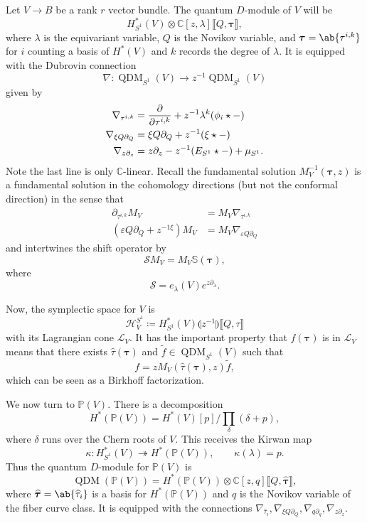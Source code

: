 \documentclass[leqno, openany]{memoir}
\theoremstyle{definition}
\theoremstyle{remark}
\theoremstyle{plain}
\theoremstyle{definition}
\theoremstyle{remark}
\newcommand{\C}{\mathbb{C}}
\renewcommand{\P}{\mathbb{P}}
\newcommand{\ep}{\varepsilon}
\newcommand{\mc}[1]{\mathcal{#1}}
\newcommand{\wt}[1]{\widetilde{#1}}
\newcommand{\wh}[1]{\widehat{#1}}
\DeclareMathOperator{\QDM}{QDM}
\begin{document}
Let $V \to B$ be a rank $r$ vector bundle. The quantum $D$-module of $V$ will be
\[ H^*_{S^1}(V) \otimes \C[z,\lambda] \llbracket Q,\bm{\tau} \rrbracket, \]
where $\lambda$ is the equivariant variable, $Q$ is the Novikov variable, and $\bm{\tau} = \ab\{ \tau^{i,k}\}$ for $i$ counting a basis of $H^*(V)$ and $k$ records the degree of $\lambda$. It is equipped with the Dubrovin connection
\[ \nabla \colon \QDM_{S^1}(V) \to z^{-1} \QDM_{S^1}(V) \]
given by
\begin{align*}
    \nabla_{\tau^{i,k}} &= \pdv{}{\tau^{i,k}} + z^{-1} \lambda^k (\phi_i \star - ) \\
    \nabla_{\xi Q \partial_Q} &= \xi Q \partial_Q + z^{-1} (\xi \star -) \\
    \nabla_{z \partial_z} &= z \partial_z - z^{-1} (E_{S^1} \star -) + \mu_{S^1}.
\end{align*}
Note the last line is only $\C$-linear. Recall the fundamental solution $M^{-1}_V(\bm{\tau}, z)$ is a fundamental solution in the cohomology directions (but not the conformal direction) in the sense that
\begin{align*}
    \partial_{\tau^{i,k}} M_V &= M_V \nabla_{\tau^{i,k}} \\
    (\ep Q \partial_Q + z^{-1 \xi}) M_V &= M_V \nabla_{\ep Q \partial_Q} 
\end{align*}
and intertwines the shift operator by
\[ \mc{S} M_V = M_V \mathbb{S}(\bm{\tau}), \]
where
\[ \mc{S} = e_{\lambda}(V) e^{z \partial_{\lambda}}. \]

Now, the symplectic space for $V$ is
\[ \mc{H}_V^{S^1} \coloneqq H^*_{S^1}(V) \llparenthesis z^{-1} \rrparenthesis \llbracket Q,\tau \rrbracket \]
with its Lagrangian cone $\mc{L}_V$. It has the important property that $f(\bm{\tau})$ is in $\mc{L}_V$ means that there exists $\wh{\tau}(\bm{\tau})$ and $\wt{f} \in \QDM_{S^1}(V)$ such that 
\[ f = z M_V(\wh{\tau}(\bm{\tau}), z) \wt{f}, \]
which can be seen as a Birkhoff factorization.

We now turn to $\P(V)$. There is a decomposition
\[ H^*(\P(V)) = H^*(V)[p] / \prod_{\delta} (\delta + p), \]
where $\delta$ runs over the Chern roots of $V$. This receives the Kirwan map
\[ \kappa \colon H_{S^1}^*(V) \twoheadrightarrow H^*(\P(V)), \qquad \kappa (\lambda) = p. \]
Thus the quantum $D$-module for $\P(V)$ is
\[ \QDM(\P(V)) = H^*(\P(V)) \otimes \C[z,q] \llbracket Q, \wh{\bm{\tau}} \rrbracket, \]
where $\wh{\bm{\tau}} = \ab\{ \wh{\tau}_i\}$ is a basis for $H^*(\P(V))$ and $q$ is the Novikov variable of the fiber curve class. It is equipped with the connections $\nabla_{\wh{\tau}_i}, \nabla_{\xi Q \partial_Q}, \nabla_{q \partial_q}, \nabla_{z \partial_z}$.
\end{document}
